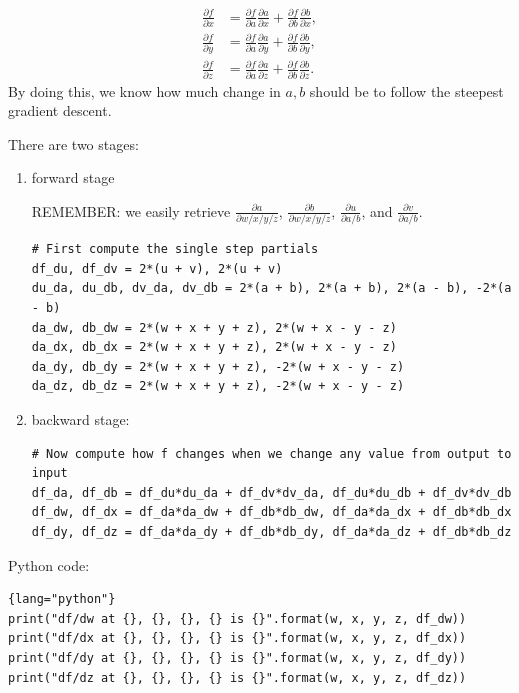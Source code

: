 \begin{equation}
\begin{aligned}
\frac{\partial f}{\partial x} & = \frac{\partial f}{\partial a}\frac{\partial a}{\partial x} + \frac{\partial f}{\partial b}\frac{\partial b}{\partial x}, \\
\frac{\partial f}{\partial y} & = \frac{\partial f}{\partial a}\frac{\partial a}{\partial y}+\frac{\partial f}{\partial b}\frac{\partial b}{\partial y}, \\
\frac{\partial f}{\partial z} & = \frac{\partial f}{\partial a}\frac{\partial a}{\partial z}+\frac{\partial f}{\partial b}\frac{\partial b}{\partial z}.
\end{aligned}
\end{equation}
By doing this, we know how much change in $a, b$ should be to follow the steepest gradient descent.


There are two stages:
\begin{enumerate}
  \item forward stage
  
REMEMBER: we easily retrieve $\frac{\partial a}{\partial w/x/y/z}$, 
$\frac{\partial b}{\partial w/x/y/z}$,
 $\frac{\partial u}{\partial a/b}$, and 
 $\frac{\partial v}{\partial a/b}$.

\begin{lstlisting}
# First compute the single step partials
df_du, df_dv = 2*(u + v), 2*(u + v)
du_da, du_db, dv_da, dv_db = 2*(a + b), 2*(a + b), 2*(a - b), -2*(a - b)
da_dw, db_dw = 2*(w + x + y + z), 2*(w + x - y - z)
da_dx, db_dx = 2*(w + x + y + z), 2*(w + x - y - z)
da_dy, db_dy = 2*(w + x + y + z), -2*(w + x - y - z)
da_dz, db_dz = 2*(w + x + y + z), -2*(w + x - y - z)
\end{lstlisting}

  \item backward stage: 
\begin{lstlisting}
# Now compute how f changes when we change any value from output to input
df_da, df_db = df_du*du_da + df_dv*dv_da, df_du*du_db + df_dv*dv_db
df_dw, df_dx = df_da*da_dw + df_db*db_dw, df_da*da_dx + df_db*db_dx
df_dy, df_dz = df_da*da_dy + df_db*db_dy, df_da*da_dz + df_db*db_dz
\end{lstlisting}


\end{enumerate}
  
Python code:
\begin{lstlisting}{lang="python"}
print("df/dw at {}, {}, {}, {} is {}".format(w, x, y, z, df_dw))
print("df/dx at {}, {}, {}, {} is {}".format(w, x, y, z, df_dx))
print("df/dy at {}, {}, {}, {} is {}".format(w, x, y, z, df_dy))
print("df/dz at {}, {}, {}, {} is {}".format(w, x, y, z, df_dz))
\end{lstlisting}


